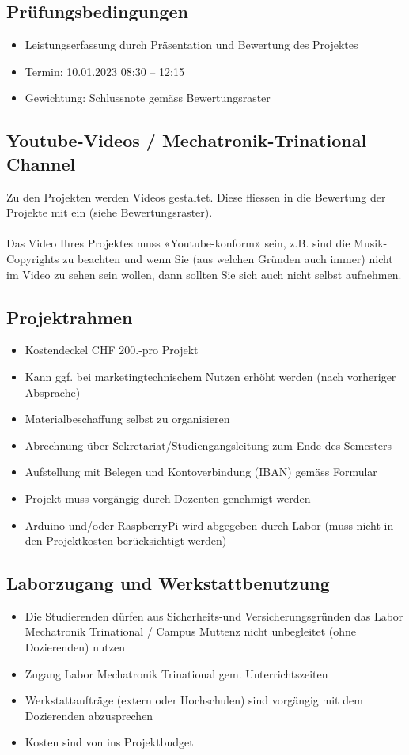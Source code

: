 \subsection*{Prüfungsbedingungen}
\begin{itemize}
    \item Leistungserfassung durch Präsentation und Bewertung des Projektes
    \item Termin: 10.01.2023	08:30 – 12:15
    \item Gewichtung: Schlussnote gemäss Bewertungsraster
\end{itemize}

\subsection*{Youtube-Videos / Mechatronik-Trinational Channel}
Zu den Projekten werden Videos gestaltet. Diese fliessen in die Bewertung der Projekte mit ein (siehe Bewertungsraster).\\
\\
Das Video Ihres Projektes muss «Youtube-konform» sein, z.B. sind die Musik-Copyrights zu beachten und wenn Sie (aus welchen Gründen auch immer) nicht im Video zu sehen sein wollen, dann sollten Sie sich auch nicht selbst aufnehmen.

\subsection*{Projektrahmen}
\begin{itemize}
    \item Kostendeckel CHF 200.-pro Projekt
    \item Kann ggf. bei marketingtechnischem Nutzen erhöht werden (nach vorheriger Absprache)
    \item Materialbeschaffung selbst zu organisieren
    \item Abrechnung über Sekretariat/Studiengangsleitung zum Ende des Semesters    
    \item Aufstellung mit Belegen und Kontoverbindung (IBAN) gemäss Formular
    \item Projekt muss vorgängig durch Dozenten genehmigt werden
    \item Arduino und/oder RaspberryPi wird abgegeben durch Labor (muss nicht in den Projektkosten berücksichtigt werden)
\end{itemize}

\subsection*{Laborzugang und Werkstattbenutzung}
\begin{itemize}
    \item Die Studierenden dürfen aus Sicherheits-und Versicherungsgründen das Labor Mechatronik Trinational / Campus Muttenz nicht unbegleitet (ohne Dozierenden) nutzen
    \item Zugang Labor Mechatronik Trinational gem. Unterrichtszeiten
    \item Werkstattaufträge (extern oder Hochschulen) sind vorgängig mit dem Dozierenden abzusprechen
    \item Kosten sind von ins Projektbudget 
\end{itemize}